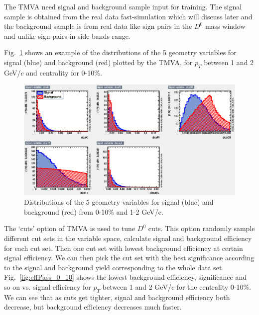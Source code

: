 The TMVA need signal and background sample input for training. The signal sample is obtained from the real data fast-simulation which will discuss later and the background sample is from real data like sign pairs in the $D^0$ mass window and unlike sign pairs in side bands range. 

Fig.~\ref{fig:variables_0_10} shows an example of the distributions of the 5 geometry variables for signal (blue) and background (red) plotted by the TMVA, for $p_T$ between 1 and 2 GeV/$c$ and centrality for 0-10\%.

\begin{figure}[htbp]
\centering
\includegraphics[keepaspectratio,width=1.0\textwidth]{figure/Run14_D0HFT/variables_id_c1_0_10.eps}
\caption{Distributions of the 5 geometry variables for signal (blue) and background (red) from 0-10\% and 1-2 GeV/c.}
\label{fig:variables_0_10}
\end{figure}

The `cuts' option of TMVA is used to tune $D^0$ cuts. This option randomly sample different cut sets in the variable space, calculate signal and background efficiency for each cut set. Then one cut set with lowest background efficiency at certain signal efficiency. We can then pick the cut set with the best significance according to the signal and background yield corresponding to the whole data set. Fig.~\ref{fig:effPass_0_10} shows the lowest background efficiency, significance and so on vs. signal efficiency for $p_T$ between 1 and 2 GeV/$c$ for the centrality 0-10\%. We can see that as cuts get tighter, signal and background efficiency both decrease, but background efficiency decreases much faster.

